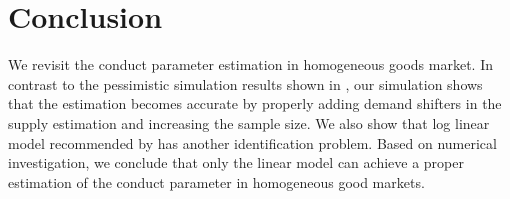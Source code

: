 \documentclass[11pt, a4paper]{article}
\begin{document}


    
\section{Conclusion}

We revisit the conduct parameter estimation in homogeneous goods market. In contrast to the pessimistic simulation results shown in \cite{perloff2012collinearity}, our simulation shows that the estimation becomes accurate by properly adding demand shifters in the supply estimation and increasing the sample size. We also show that log linear model recommended by \cite{perloff2012collinearity} has another identification problem. Based on numerical investigation, we conclude that only the linear model can achieve a proper estimation of the conduct parameter in homogeneous good markets. 




\end{document}
